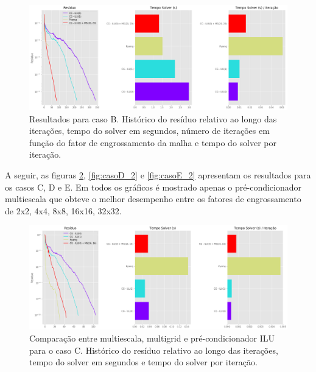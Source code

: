 \begin{figure}[!htbp]
\label{fig:reservatorio320x320_2}
\centering
\includegraphics[width=\textwidth]{chap08/figs/reservatorio320x320_2.png}
\caption{Resultados para caso B. Histórico do resíduo relativo ao longo das iterações, tempo do solver em segundos, número de iterações em função do fator de engrossamento da malha e tempo do solver por iteração. }
\end{figure}


A seguir, as figuras \ref{fig:casoC_2}, \ref{fig:casoD_2} e \ref{fig:casoE_2} apresentam os resultados para os casos C, D e E. Em todos os gráficos é mostrado apenas o pré-condicionador multiescala que obteve o melhor desempenho entre os fatores de engrossamento de 2x2, 4x4, 8x8, 16x16, 32x32.



\begin{figure}[!htbp]
\label{fig:casoC_2}
\centering
\includegraphics[width=\textwidth]{chap08/figs/casoC_2.png}
\caption{Comparação entre multiescala, multigrid e pré-condicionador ILU para o caso C. Histórico do resíduo relativo ao longo das iterações, tempo do solver em segundos e tempo do solver por iteração. }
\end{figure}



